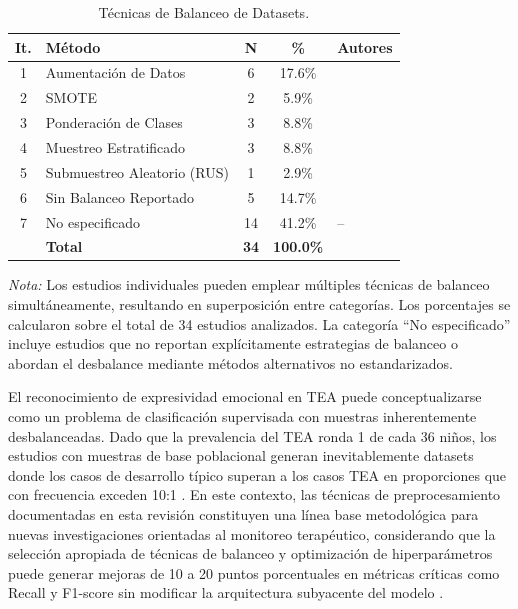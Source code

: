 \documentclass[ASNA,twocolumn]{USG}
\begin{document}
	\begin{table}[!ht]
		\centering
		\caption{Técnicas de Balanceo de Datasets.\label{tab15}}
		{\setlength{\tabcolsep}{3pt}
			\begin{tabular*}{\columnwidth}{@{\extracolsep\fill}clccl@{\extracolsep\fill}}
				\toprule
				\textbf{It.} & \textbf{Método} & \textbf{N} & \textbf{\%} & \textbf{Autores} \\
				\midrule
				1 & Aumentación de Datos         & 6  & 17.6\% & \cite{Shaik2025,Radocaj2025,Sholikah2024,Aljbori2025,Ramachandran2025,Hosney2024} \\
				2 & SMOTE                        & 2  & 5.9\%  & \cite{Radocaj2025,Alam2025} \\
				3 & Ponderación de Clases        & 3  & 8.8\%  & \cite{Johnson2025,Washington2022,Alam2025} \\
				4 & Muestreo Estratificado       & 3  & 8.8\%  & \cite{Radocaj2025,Rhatassi2025,Ramachandran2025} \\
				5 & \parbox[t]{2.2cm}{Submuestreo Aleatorio (RUS)} & 1 & 2.9\% & \cite{Alam2025} \\[6pt]
				6 & Sin Balanceo Reportado       & 5  & 14.7\% & \cite{Ahmad2024,Levy2024,Alsubai2025,Almeida2019,Nagae2022} \\
				7 & No especificado              & 14 & 41.2\% & -- \\
				& \textbf{Total}               & \textbf{34} & \textbf{100.0\%} & \\
				\bottomrule
		\end{tabular*}}
		\begin{tablenotes}
			\item {\it Nota:} Los estudios individuales pueden emplear múltiples técnicas de
			balanceo simultáneamente, resultando en superposición entre categorías. Los
			porcentajes se calcularon sobre el total de 34 estudios analizados. La categoría
			``No especificado'' incluye estudios que no reportan explícitamente estrategias de
			balanceo o abordan el desbalance mediante métodos alternativos no estandarizados.
		\end{tablenotes}
	\end{table}
	
	El reconocimiento de expresividad emocional en TEA puede conceptualizarse como un
	problema de clasificación supervisada con muestras inherentemente desbalanceadas.
	Dado que la prevalencia del TEA ronda 1 de cada 36 niños, los estudios con muestras
	de base poblacional generan inevitablemente datasets donde los casos de desarrollo
	típico superan a los casos TEA en proporciones que con frecuencia exceden 10:1 \cite{Shaik2025}.
	En este contexto, las técnicas de preprocesamiento documentadas en esta revisión
	constituyen una línea base metodológica para nuevas investigaciones orientadas al
	monitoreo terapéutico, considerando que la selección apropiada de técnicas de
	balanceo y optimización de hiperparámetros puede generar mejoras de 10 a 20 puntos
	porcentuales en métricas críticas como Recall y F1-score sin modificar la
	arquitectura subyacente del modelo \cite{Alam2025}.
	
\end{document}
